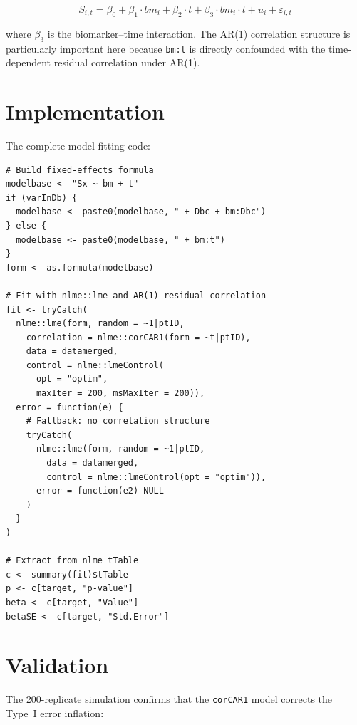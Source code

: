\documentclass[11pt]{article}
\begin{document}
\begin{equation}
S_{i,t} = \beta_0 + \beta_1 \cdot bm_i + \beta_2 \cdot t +
\beta_3 \cdot bm_i \cdot t + u_i + \varepsilon_{i,t}
\label{eq:OL}
\end{equation}

where $\beta_3$ is the biomarker--time interaction. The AR(1)
correlation structure is particularly important here because
\texttt{bm:t} is directly confounded with the time-dependent
residual correlation under AR(1).

\section{Implementation}

The complete model fitting code:

\begin{verbatim}
# Build fixed-effects formula
modelbase <- "Sx ~ bm + t"
if (varInDb) {
  modelbase <- paste0(modelbase, " + Dbc + bm:Dbc")
} else {
  modelbase <- paste0(modelbase, " + bm:t")
}
form <- as.formula(modelbase)

# Fit with nlme::lme and AR(1) residual correlation
fit <- tryCatch(
  nlme::lme(form, random = ~1|ptID,
    correlation = nlme::corCAR1(form = ~t|ptID),
    data = datamerged,
    control = nlme::lmeControl(
      opt = "optim",
      maxIter = 200, msMaxIter = 200)),
  error = function(e) {
    # Fallback: no correlation structure
    tryCatch(
      nlme::lme(form, random = ~1|ptID,
        data = datamerged,
        control = nlme::lmeControl(opt = "optim")),
      error = function(e2) NULL
    )
  }
)

# Extract from nlme tTable
c <- summary(fit)$tTable
p <- c[target, "p-value"]
beta <- c[target, "Value"]
betaSE <- c[target, "Std.Error"]
\end{verbatim}

\section{Validation}

The 200-replicate simulation confirms that the \texttt{corCAR1}
model corrects the Type~I error inflation:
\end{document}
